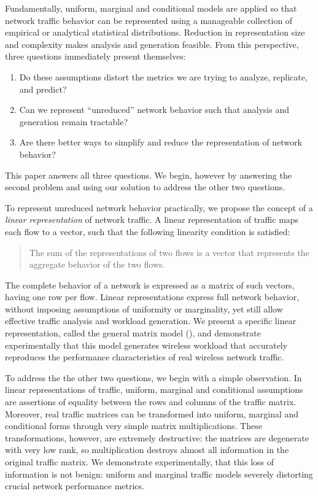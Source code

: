 \documentclass[twocolumn,final]{svjour3}
\begin{document}
Fundamentally, uniform, marginal and conditional models are applied so that network traffic behavior can be represented using a manageable collection of empirical or analytical statistical distributions.
Reduction in representation size and complexity makes analysis and generation feasible.
From this perspective, three questions immediately present themselves:
\begin{enumerate}
\item Do these assumptions distort the metrics we are trying to analyze, replicate, and predict?
\item Can we represent ``unreduced'' network behavior such that analysis and generation remain tractable?
\item Are there better ways to simplify and reduce the representation of network behavior?
\end{enumerate}
This paper answers all three questions. We begin, however by answering the second problem and  
using our solution to address the other two questions.

To represent unreduced network behavior practically, we propose the concept of a \emph{linear representation} of network traffic.
A linear representation of traffic maps each flow to a vector, such that the following linearity condition is satisfied:
\begin{quote}
The sum of the representations of two flows is a vector that represents the aggregate behavior of the two flows.
\end{quote}
The complete behavior of a network is expressed as a matrix of such vectors, having one row per flow.
Linear representations express full network behavior, without imposing assumptions of uniformity or marginality, yet still allow effective traffic analysis and workload generation.
We present a specific linear representation, called the general matrix model (), and demonstrate experimentally that this model generates wireless workload that accurately reproduces the performance characteristics of real wireless network traffic.


To address the the other two questions, we begin with a simple observation.
In linear representations of traffic, uniform, marginal and conditional assumptions are assertions of equality between the rows and columns of the traffic matrix.
Moreover, real traffic matrices can be transformed into uniform, marginal and conditional forms through very simple matrix multiplications.
These transformations, however, are extremely destructive: the matrices are degenerate with very low rank, so multiplication destroys almost all information in the original traffic matrix.
We demonstrate experimentally, that this loss of information is not benign:
uniform and marginal traffic models severely distorting crucial network performance metrics.
\end{document}
